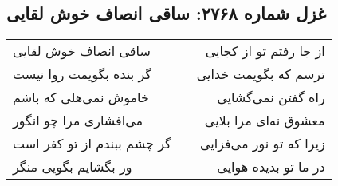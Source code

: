 \begin{center}
\section*{غزل شماره ۲۷۶۸: ساقی انصاف خوش لقایی}
\label{sec:2768}
\begin{longtable}{l p{0.5cm} r}
ساقی انصاف خوش لقایی
&&
از جا رفتم تو از کجایی
\\
گر بنده بگویمت روا نیست
&&
ترسم که بگویمت خدایی
\\
خاموش نمی‌هلی که باشم
&&
راه گفتن نمی‌گشایی
\\
می‌افشاری مرا چو انگور
&&
معشوق نه‌ای مرا بلایی
\\
گر چشم ببندم از تو کفر است
&&
زیرا که تو نور می‌فزایی
\\
ور بگشایم بگویی منگر
&&
در ما تو بدیده هوایی
\\
\end{longtable}
\end{center}
